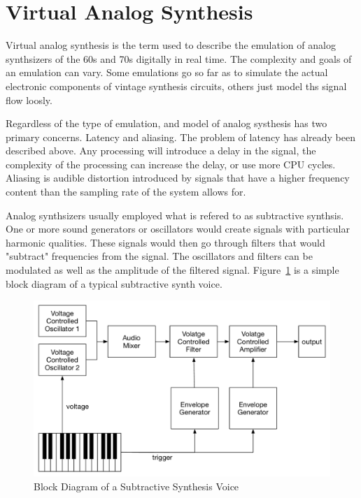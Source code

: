\section{Virtual Analog Synthesis}

Virtual analog synthesis is the term used to describe the emulation of analog synthsizers of the 60s and 70s digitally in real time. The complexity and goals of an emulation can vary. Some emulations go so far as to simulate the actual electronic components of vintage synthesis circuits, others just model ths signal flow loosly.

Regardless of the type of emulation, and model of analog systhesis has two primary concerns. Latency and aliasing. The problem of latency has already been described above. Any processing will introduce a delay in the signal, the complexity of the processing can increase the delay, or use more CPU cycles. Aliasing is audible distortion introduced by signals that have a higher frequency content than the sampling rate of the system allows for\cite{virtual_analog_synthesis}.

Analog synthsizers usually employed what is refered to as subtractive synthsis. One or more sound generators or oscillators would create signals with particular harmonic qualities. These signals would then go through filters that would "subtract" frequencies from the signal. The oscillators and filters can be modulated as well as the amplitude of the filtered signal. Figure~\ref{fig:synth_voice_block} is a simple block diagram of a typical subtractive synth voice.

\begin{figure}[h]
    \centering
    \includegraphics[width=\textwidth]{assets/synth_voice_block.pdf}
    \caption{Block Diagram of a Subtractive Synthesis Voice}
    \label{fig:synth_voice_block}
\end{figure}

